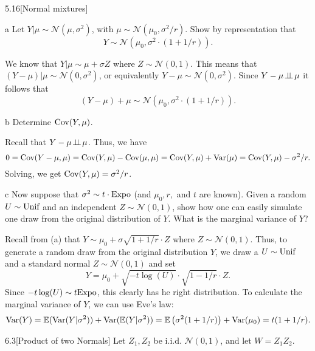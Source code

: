 \documentclass{pset}
\begin{document}
\begin{problem}{5.16}[Normal mixtures]
\end{problem}

\begin{parts}
  \begin{part}{a}
    Let $Y|\mu \sim \mathcal{N}(\mu, \sigma^2)$, with $\mu\sim \mathcal{N}(\mu_0, \sigma^2/r)$. Show by representation that
    \[Y\sim \mathcal{N}(\mu_0, \sigma^2 \cdot (1+ 1/r)).\]
  \end{part}

  We know that $Y|\mu \sim \mu + \sigma Z$ where $Z \sim \mathcal{N}(0,1)$. This means that $(Y-\mu)|\mu \sim \mathcal{N}(0,\sigma^2)$, or equivalently $Y-\mu \sim \mathcal{N}(0,\sigma^2)$. Since $Y-\mu\!\perp\!\!\!\perp\! \mu$ it follows that
  \[(Y-\mu) + \mu \sim \mathcal{N}(\mu_0, \sigma^2\cdot (1+1/r)).\]

  \begin{part}{b}
    Determine $\textrm{Cov}(Y, \mu)$.
  \end{part}

  Recall that $Y-\mu\!\perp\!\!\!\perp\! \mu$. Thus, we have
  \[
    0=\textrm{Cov}(Y-\mu, \mu) = \textrm{Cov}(Y,\mu) - \textrm{Cov}(\mu, \mu) = \textrm{Cov}(Y, \mu) + \textrm{Var}(\mu) = \textrm{Cov}(Y, \mu) - \sigma^2/r.
  \]
  Solving, we get $\textrm{Cov}(Y,\mu) = \sigma^2/r$.

  \begin{part}{c}
    Now suppose that $\sigma^2 \sim t\cdot \textrm{Expo}$ (and $\mu_0, r,$ and $t$ are known). Given a random $U\sim \textrm{Unif}$ and an independent $Z\sim \mathcal{N}(0,1)$, show how one can easily simulate one draw from the original distribution of $Y$. What is the marginal variance of $Y$?
  \end{part}

  Recall from (a) that $Y \sim \mu_0 + \sigma \sqrt{1+1/r}\cdot Z$ where $Z\sim \mathcal{N}(0,1)$. Thus, to generate a random draw from the original distribution $Y$, we draw a $U\sim \textrm{Unif}$ and a standard normal $Z\sim \mathcal{N}(0,1)$ and set
  \[Y =\mu_0 + \sqrt{-t\log(U)} \cdot \sqrt{1-1/r}\cdot Z.\]
  Since $-t\log(U)\sim t \textrm{Expo}$, this clearly has he right distribution. To calculate the marginal variance of $Y$, we can use Eve's law:
  \[
    \textrm{Var}(Y) = \mathbb{E}(\textrm{Var}(Y|\sigma^2)) + \textrm{Var}(\mathbb{E}(Y|\sigma^2)) = \mathbb{E}\left(\sigma^2(1+1/r)\right) + \textrm{Var}(\mu_0) = t(1+1/r).
  \]
\end{parts}

\begin{problem}{6.3}[Product of two Normals]
  Let $Z_1, Z_2$ be i.i.d. $\mathcal{N}(0,1)$, and let $W=Z_1 Z_2$.
\end{problem}
\end{document}
